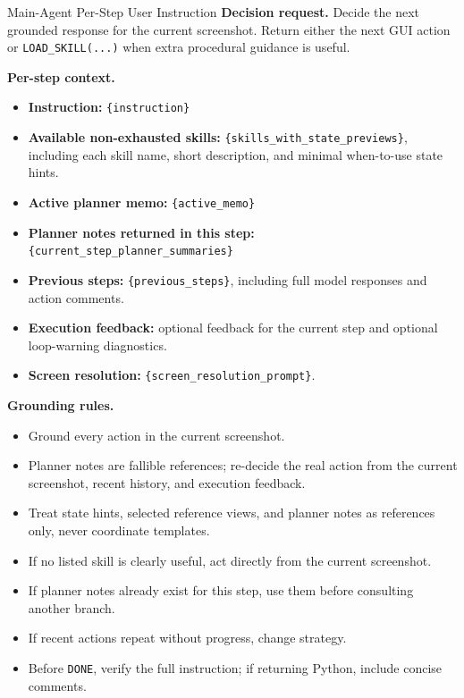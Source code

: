 \documentclass{llmxive}
\begin{document}
\begin{promptbox}{Main-Agent Per-Step User Instruction}
\textbf{Decision request.} Decide the next grounded response for the current screenshot. Return either the next GUI action or \texttt{LOAD\_SKILL(...)} when extra procedural guidance is useful.

\medskip
\textbf{Per-step context.}
\begin{itemize}[leftmargin=*, itemsep=0.2em]
    \item \textbf{Instruction:} \texttt{\{instruction\}}
    \item \textbf{Available non-exhausted skills:} \texttt{\{skills\_with\_state\_previews\}}, including each skill name, short description, and minimal when-to-use state hints.
    \item \textbf{Active planner memo:} \texttt{\{active\_memo\}}
    \item \textbf{Planner notes returned in this step:} \texttt{\{current\_step\_planner\_summaries\}}
    \item \textbf{Previous steps:} \texttt{\{previous\_steps\}}, including full model responses and action comments.
    \item \textbf{Execution feedback:} optional feedback for the current step and optional loop-warning diagnostics.
    \item \textbf{Screen resolution:} \texttt{\{screen\_resolution\_prompt\}}.
\end{itemize}

\textbf{Grounding rules.}
\begin{itemize}[leftmargin=*, itemsep=0.2em]
    \item Ground every action in the current screenshot.
    \item Planner notes are fallible references; re-decide the real action from the current screenshot, recent history, and execution feedback.
    \item Treat state hints, selected reference views, and planner notes as references only, never coordinate templates.
    \item If no listed skill is clearly useful, act directly from the current screenshot.
    \item If planner notes already exist for this step, use them before consulting another branch.
    \item If recent actions repeat without progress, change strategy.
    \item Before \texttt{DONE}, verify the full instruction; if returning Python, include concise comments.
\end{itemize}
\end{promptbox}
\end{document}
